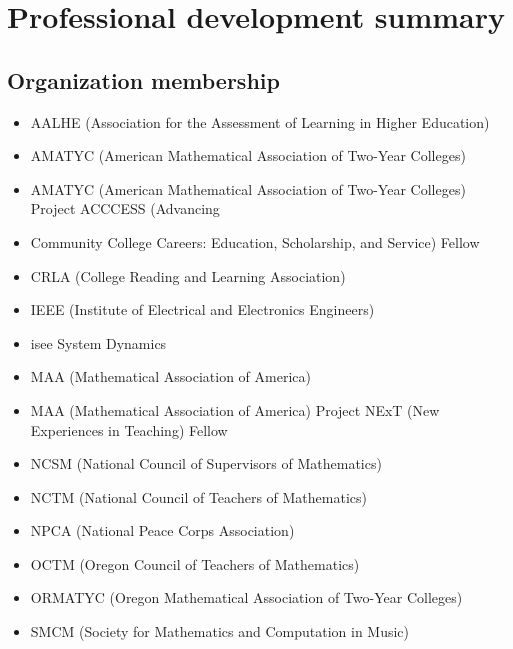 \chapter{Professional development summary}\label{app:sec:memberships}

\section*{Organization membership}

\begin{itemize}[label={}]
\item AALHE (Association for the Assessment of Learning in Higher Education)
\item AMATYC (American Mathematical Association of Two-Year Colleges)
\item AMATYC (American Mathematical Association of Two-Year Colleges) Project ACCCESS  (Advancing \item Community College Careers:  Education, Scholarship, and Service) Fellow
\item CRLA (College Reading and Learning Association)
\item IEEE (Institute of Electrical and Electronics Engineers)
\item isee System Dynamics
\item MAA (Mathematical Association of America)
\item MAA (Mathematical Association of America) Project NExT (New Experiences in Teaching) Fellow
\item NCSM (National Council of Supervisors of Mathematics)
\item NCTM (National Council of Teachers of Mathematics)
\item NPCA (National Peace Corps Association)
\item OCTM (Oregon Council of Teachers of Mathematics)
\item ORMATYC (Oregon Mathematical Association of Two-Year Colleges)
\item SMCM (Society for Mathematics and Computation in Music)
\end{itemize}

